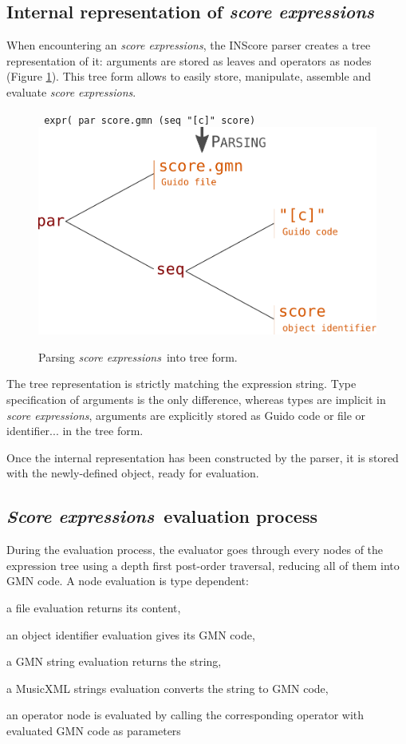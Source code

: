 \documentclass{article}
\newcommand{\OSC}[1]{\texttt{#1}}
\newcommand{\oper}[1]{\textcolor{figRed}{#1}}
\newcommand{\param}[1]{\textcolor{figOrange}{#1}}
\newcommand{\sExpr}{\emph{score expressions}}
\newcommand{\SExpr}{\emph{Score expressions}}
\let\olditemize\itemize
\let\oldenditemize\enditemize
\renewenvironment{itemize} 	{\olditemize \setlength{\itemsep}{1mm}}{\oldenditemize}
\begin{document}
\subsection{Internal representation of \sExpr}

When encountering an \sExpr, the INScore parser creates a tree representation of it: arguments are stored as leaves and operators as nodes (Figure \ref{fig:parsing}). This tree form allows to easily  store, manipulate, assemble and evaluate \sExpr.

\begin{figure}[th]
\centering
\OSC{ expr( \oper{par} \param{score.gmn}  (\oper{seq} \param{"[c]" score})}
\includegraphics[width=0.9\columnwidth]{imgs/exprParse}
\caption{Parsing \sExpr\ into tree form.
\label{fig:parsing}}
\end{figure}

The tree representation is strictly matching the expression string. Type specification of arguments is the only difference, whereas types are implicit in \sExpr, arguments are explicitly stored as Guido code or file or identifier... in the tree form. 

Once the internal representation has been constructed by the parser, it is stored with the newly-defined object, ready for evaluation.

\subsection{\SExpr\ evaluation process}
During the evaluation process, the evaluator goes through every nodes of the expression tree using a depth first post-order traversal, reducing all of them into GMN code.
A node evaluation is type dependent:  
\begin{itemize}
\item a file evaluation returns its content,
\item an object identifier evaluation gives its GMN code,
\item a GMN string evaluation returns the string,
\item a MusicXML strings evaluation converts the string to GMN code,
\item an operator node is evaluated by calling the corresponding operator with evaluated GMN code as parameters
\end{itemize}
\end{document}
